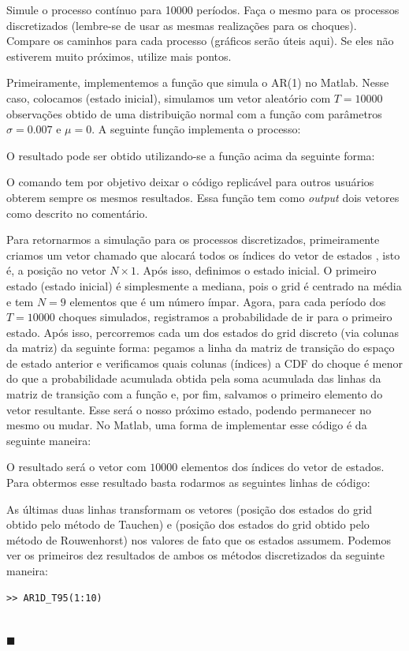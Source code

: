 \documentclass[10pt]{article}
\newcommand*{\QEDA}{\hfill\ensuremath{\blacksquare}}%
\newcommand\0{\mathbf{0}}
\newenvironment{sol}
    {\\[1em] {\color{magenta}\text{Resposta.}}
    }
    {{\color{blue!50!black}\QEDA}}
\begin{document}
Simule o processo contínuo para 10000 períodos. Faça o mesmo para os
processos discretizados (lembre-se de usar as mesmas realizações para
os choques). Compare os caminhos para cada processo (gráficos serão
úteis aqui). Se eles não estiverem muito próximos, utilize mais pontos.
\begin{sol}
Primeiramente, implementemos a função que simula o AR(1) no Matlab. Nesse caso, colocamos  (estado inicial), simulamos um vetor aleatório com $T = 10000$ observações obtido de uma distribuição normal com a função  com parâmetros $\sigma = 0.007$ e $\mu = 0$.  A seguinte função implementa o processo:

O resultado pode ser obtido utilizando-se a função acima da seguinte forma:

O comando  tem por objetivo deixar o código replicável para outros usuários obterem sempre os mesmos resultados. Essa função tem como \textit{output} dois vetores como descrito no comentário. 

Para retornarmos a simulação para os processos discretizados, primeiramente criamos um vetor chamado  que alocará todos os índices do vetor de estados , isto é, a posição no vetor $N\times 1$. Após isso, definimos o estado inicial. O primeiro estado (estado inicial) é simplesmente a mediana, pois o grid é centrado na média e tem $N = 9$ elementos que é um número ímpar. Agora, para cada período dos $T = 10000$ choques simulados, registramos a probabilidade de ir para o primeiro estado. Após isso, percorremos cada um dos estados do grid discreto (via colunas da matriz) da seguinte forma: pegamos a linha da matriz de transição do espaço de estado anterior e verificamos quais colunas (índices) a CDF do choque  é menor do que a probabilidade acumulada obtida pela soma acumulada das linhas da matriz de transição com a função  e, por fim, salvamos o primeiro elemento do vetor resultante. Esse será o nosso próximo estado, podendo permanecer no mesmo ou mudar. No Matlab, uma forma de implementar esse código é da seguinte maneira:

O resultado será o vetor  com $10000$ elementos dos índices do vetor de estados. Para obtermos esse resultado basta rodarmos as seguintes linhas de código:

As últimas duas linhas transformam os vetores  (posição dos estados do grid obtido pelo método de Tauchen) e  (posição dos estados do grid obtido pelo método de Rouwenhorst) nos valores de fato que os estados assumem. Podemos ver os primeiros dez resultados  de ambos os métodos discretizados da seguinte maneira:
\begin{lstlisting}
>> AR1D_T95(1:10)


\end{lstlisting}
\end{sol}
\end{document}
